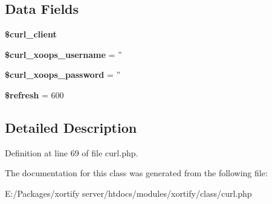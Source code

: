 \subsection*{Data Fields}
\begin{DoxyCompactItemize}
\item 
\hypertarget{class_c_u_r_l_xortify_exchange_a402f2112991f3227835af80e9df33e38}{{\bfseries \$curl\-\_\-client}}\label{class_c_u_r_l_xortify_exchange_a402f2112991f3227835af80e9df33e38}

\item 
\hypertarget{class_c_u_r_l_xortify_exchange_aab7480ba9f878a02b2c9fd43922fa070}{{\bfseries \$curl\-\_\-xoops\-\_\-username} = ''}\label{class_c_u_r_l_xortify_exchange_aab7480ba9f878a02b2c9fd43922fa070}

\item 
\hypertarget{class_c_u_r_l_xortify_exchange_a6c9851541ed3826c67cfe7224c38f0b8}{{\bfseries \$curl\-\_\-xoops\-\_\-password} = ''}\label{class_c_u_r_l_xortify_exchange_a6c9851541ed3826c67cfe7224c38f0b8}

\item 
\hypertarget{class_c_u_r_l_xortify_exchange_a8527f826b6959aaa92b0e51ee427ba1a}{{\bfseries \$refresh} = 600}\label{class_c_u_r_l_xortify_exchange_a8527f826b6959aaa92b0e51ee427ba1a}

\end{DoxyCompactItemize}


\subsection{Detailed Description}


Definition at line 69 of file curl.\-php.



The documentation for this class was generated from the following file\-:\begin{DoxyCompactItemize}
\item 
E\-:/\-Packages/xortify server/htdocs/modules/xortify/class/curl.\-php\end{DoxyCompactItemize}
